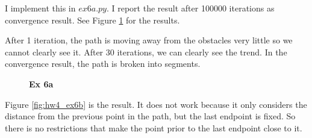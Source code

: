 \documentclass[
  course = {{16-811 Math Fundamentals for Robotics}},
  quartile = {{1}},
  assignment = 4,
  name = {{Kangle Deng}},
  email = {{kangled@andrew.cmu.edu}},
  firstexercise = 1
]{aga-homework}
\begin{document}
\exercise
\subexercise
I implement this in $ex6a.py$. I report the result after 100000 iterations as convergence result. See Figure \ref{fig:hw4_ex6a} for the results.

After 1 iteration, the path is moving away from the obstacles very little so we cannot clearly see it. After 30 iterations, we can clearly see the trend. In the convergence result, the path is broken into segments.

\begin{figure}
    \centering
    \caption{\textbf{Ex 6a}}
    \label{fig:hw4_ex6a}
\end{figure}

\subexercise
Figure \ref{fig:hw4_ex6b} is the result. It does not work because it only considers the distance from the previous point in the path, but the last endpoint is fixed. So there is no restrictions that make the point prior to the last endpoint close to it.
\end{document}

